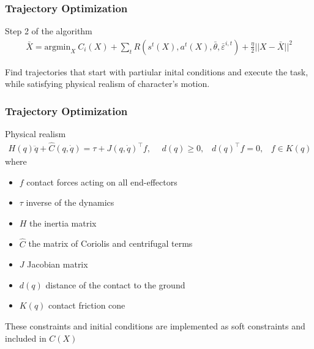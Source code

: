 \documentclass[mathserif]{beamer}
\begin{document}
\begin{frame}
  \frametitle{{Trajectory Optimization}}
  \begin{block}{Step 2 of the algorithm}
  \begin{align*}
  \bar{X} = \text{argmin}_{X} ~C_{i}(X) + \sum_{t} R(s^t(X),a^t(X),\bar{\theta},\bar{\varepsilon}^{i,t}) + \frac{\eta}{2}||X-\bar{X}||^2
  \end{align*}
  
  \vspace{15pt}
  
    Find trajectories that start with partiular inital conditions and execute the task, while satisfying physical realism of character's motion.
  \end{block}

\end{frame}



\begin{frame}
  \frametitle{{Trajectory Optimization}}
  \begin{block}{Physical realism}
  \begin{align*}
H(q)\ddot{q} + \hat{C}(q,\dot{q}) = \tau + J(q,\dot{q})^{\top}f, \hspace{15pt}
 d(q) \geq 0,  \hspace{10pt}
 d(q)^{\top}f = 0,  \hspace{10pt}
 f \in K(q) 
  \end{align*}
  where 
  \begin{itemize}
  \item $f$ contact forces acting on all end-effectors
  \item $\tau$ inverse of the dynamics
  \item $H$ the inertia matrix
  \item $\hat{C}$ the matrix of Coriolis and centrifugal terms
  \item $J$ Jacobian matrix 
  \item $d(q)$ distance of the contact to the ground 
  \item $K(q)$ contact friction cone
  \end{itemize}
  \end{block}
	
	These constraints and initial conditions are implemented as soft constraints and included in $C(X)$	
	
\end{frame}
\end{document}
